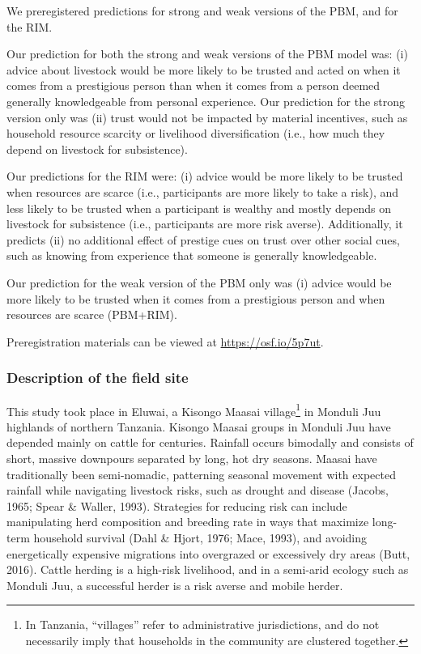 \documentclass[
  11pt,
]{article}
\begin{document}
We preregistered predictions for strong and weak versions of the PBM,
and for the RIM.

Our prediction for both the strong and weak versions of the PBM model
was: (i) advice about livestock would be more likely to be trusted and
acted on when it comes from a prestigious person than when it comes from
a person deemed generally knowledgeable from personal experience. Our
prediction for the strong version only was (ii) trust would not be
impacted by material incentives, such as household resource scarcity or
livelihood diversification (i.e., how much they depend on livestock for
subsistence).

Our predictions for the RIM were: (i) advice would be more likely to be
trusted when resources are scarce (i.e., participants are more likely to
take a risk), and less likely to be trusted when a participant is
wealthy and mostly depends on livestock for subsistence (i.e.,
participants are more risk averse). Additionally, it predicts (ii) no
additional effect of prestige cues on trust over other social cues, such
as knowing from experience that someone is generally knowledgeable.

Our prediction for the weak version of the PBM only was (i) advice would
be more likely to be trusted when it comes from a prestigious person and
when resources are scarce (PBM+RIM).

Preregistration materials can be viewed at \url{https://osf.io/5p7ut}.

\hypertarget{description-of-the-field-site}{%
\subsubsection{Description of the field
site}\label{description-of-the-field-site}}

This study took place in Eluwai, a Kisongo Maasai
village\footnote{In Tanzania, “villages” refer to administrative jurisdictions, and do not necessarily imply that households in the community are clustered together.}
in Monduli Juu highlands of northern Tanzania. Kisongo Maasai groups in
Monduli Juu have depended mainly on cattle for centuries. Rainfall
occurs bimodally and consists of short, massive downpours separated by
long, hot dry seasons. Maasai have traditionally been semi-nomadic,
patterning seasonal movement with expected rainfall while navigating
livestock risks, such as drought and disease (Jacobs, 1965; Spear \&
Waller, 1993). Strategies for reducing risk can include manipulating
herd composition and breeding rate in ways that maximize long-term
household survival (Dahl \& Hjort, 1976; Mace, 1993), and avoiding
energetically expensive migrations into overgrazed or excessively dry
areas (Butt, 2016). Cattle herding is a high-risk livelihood, and in a
semi-arid ecology such as Monduli Juu, a successful herder is a risk
averse and mobile herder.
\end{document}
